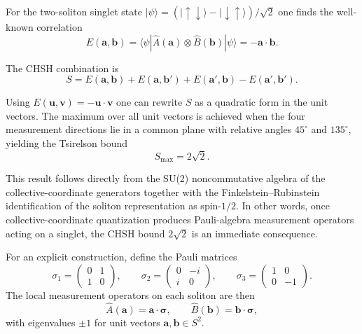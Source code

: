 ﻿\documentclass[11pt,a4paper]{article}
\begin{document}
For the two-soliton singlet state $|\psi\rangle=(|\uparrow\downarrow\rangle-|\downarrow\uparrow\rangle)/\sqrt{2}$ one finds the well-known correlation
\begin{equation}
E(\mathbf{a},\mathbf{b})=\langle\psi|\hat{A}(\mathbf{a})\otimes\hat{B}(\mathbf{b})|\psi\rangle = -\mathbf{a}\cdot\mathbf{b}.
\end{equation}

The CHSH combination is
\begin{equation}
S=E(\mathbf{a},\mathbf{b})+E(\mathbf{a},\mathbf{b}')+E(\mathbf{a}',\mathbf{b})-E(\mathbf{a}',\mathbf{b}').
\end{equation}

Using $E(\mathbf{u},\mathbf{v})=-\mathbf{u}\cdot\mathbf{v}$ one can rewrite $S$ as a quadratic form in the unit vectors. The maximum over all unit vectors is achieved when the four measurement directions lie in a common plane with relative angles $45^\circ$ and $135^\circ$, yielding the Tsirelson bound
\begin{equation}
S_{\max}=2\sqrt{2}.
\end{equation}

This result follows directly from the SU(2) noncommutative algebra of the collective-coordinate generators together with the Finkelstein--Rubinstein identification of the soliton representation as spin-$1/2$. In other words, once collective-coordinate quantization produces Pauli-algebra measurement operators acting on a singlet, the CHSH bound $2\sqrt{2}$ is an immediate consequence.

For an explicit construction, define the Pauli matrices
\begin{equation}
\sigma_1=\begin{pmatrix}0 & 1\\ 1 & 0\end{pmatrix},\qquad
\sigma_2=\begin{pmatrix}0 & -i\\ i & 0\end{pmatrix},\qquad
\sigma_3=\begin{pmatrix}1 & 0\\ 0 & -1\end{pmatrix}.
\end{equation}
The local measurement operators on each soliton are then
\begin{equation}
\hat{A}(\mathbf{a})=\mathbf{a}\cdot\boldsymbol{\sigma},\qquad
\hat{B}(\mathbf{b})=\mathbf{b}\cdot\boldsymbol{\sigma},
\end{equation}
with eigenvalues $\pm1$ for unit vectors $\mathbf{a},\mathbf{b}\in S^2$.
\end{document}
